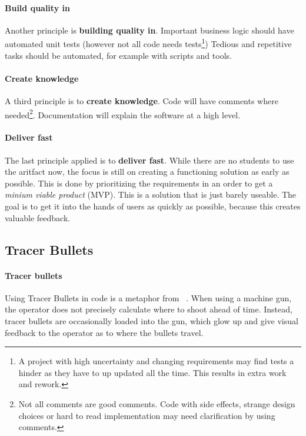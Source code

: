 \paragraph{Build quality in}
Another principle is \textbf{building quality in}.
Important business logic should have automated unit tests (however not all code needs tests\footnote{A project with high uncertainty and changing requirements may find tests a hinder as they have to up updated all the time. This results in extra work and rework.})
Tedious and repetitive tasks should be automated, for example with scripts and tools.


\paragraph{Create knowledge}
A third principle is to \textbf{create knowledge}.
Code will have comments where needed\footnote{Not all comments are good comments. Code with side effects, strange design choices or hard to read implementation may need clarification by using comments.}.
Documentation will explain the software at a high level.


\paragraph{Deliver fast}
The last principle applied is to \textbf{deliver fast}.
While there are no students to use the aritfact now, the focus is still on creating a functioning solution as early as possible.
This is done by prioritizing the requirements in an order to get a \textit{minium viable product} (MVP).
This is a solution that is just barely useable.
The goal is to get it into the hands of users as quickly as possible, because this creates valuable feedback.

\subsection{Tracer Bullets}

\paragraph{Tracer bullets}
Using Tracer Bullets in code is a metaphor from ~\cite{huntPragmaticProgrammerJourneyman2000}.
When using a machine gun, the operator does not precisely calculate where to shoot ahead of time.
Instead, tracer bullets are occasionally loaded into the gun, which glow up and give visual feedback to the operator as to where the bullets travel.


